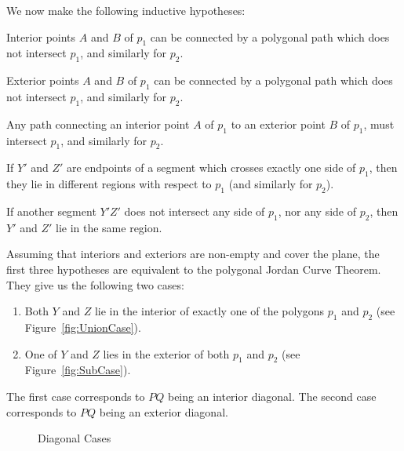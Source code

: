 We now make the following inductive hypotheses:

\begin{description}\label{sec:FirstProofInductiveHypotheses}
\item[IH1] Interior points $A$ and $B$ of $p_1$ can be connected by a polygonal path which does not intersect $p_1$, and similarly for $p_2$.
\item[IH2] Exterior points $A$ and $B$ of $p_1$ can be connected by a polygonal path which does not intersect $p_1$, and similarly for $p_2$.
\item[IH3] Any path connecting an interior point $A$ of $p_1$ to an exterior point $B$ of $p_1$, must intersect $p_1$, and similarly for $p_2$.
\item[IH4] If $Y'$ and $Z'$ are endpoints of a segment which crosses exactly one side of $p_1$, then they lie in different regions with respect to $p_1$ (and similarly for $p_2$).
\item[IH5] If another segment $Y'Z'$ does not intersect any side of $p_1$, nor any side of $p_2$, then $Y'$ and $Z'$ lie in the same region.
\end{description}

Assuming that interiors and exteriors are non-empty and cover the plane, the first three hypotheses are equivalent to the polygonal Jordan Curve Theorem. They give us the following two cases:

\begin{enumerate}
\item Both $Y$ and $Z$ lie in the interior of exactly one of the polygons $p_1$ and $p_2$ (see Figure~\ref{fig:UnionCase}).
\item One of $Y$ and $Z$ lies in the exterior of both $p_1$ and $p_2$ (see Figure~\ref{fig:SubCase}).
\end{enumerate}

The first case corresponds to $PQ$ being an interior diagonal. The second case corresponds to $PQ$ being an exterior diagonal.

\begin{figure}
\centering
{}
\caption{Diagonal Cases}
\label{fig:DiagonalCases}
\end{figure}

